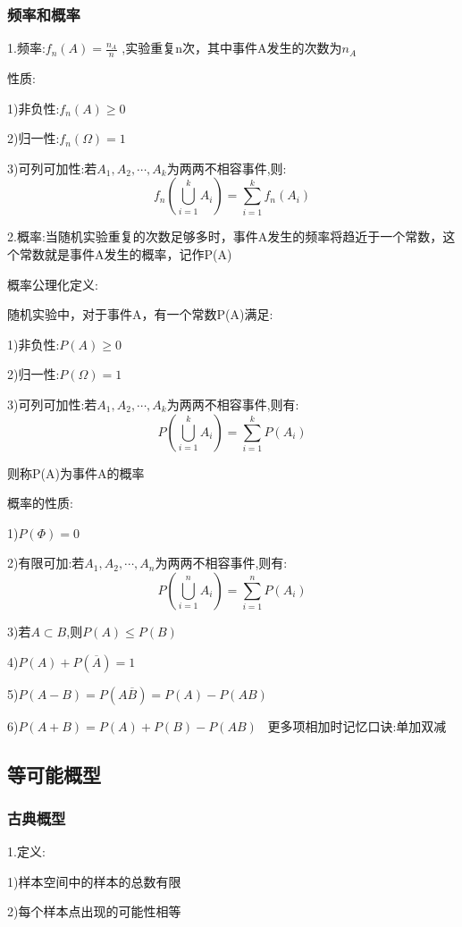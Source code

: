 \documentclass[11pt,twoside,a4paper]{ctexart}
\begin{document}
    \subsubsection{频率和概率}
    1.频率:$f_n(A) = \frac{n_A}{n}  $ ,实验重复n次，其中事件A发生的次数为$n_A $

    \quad 性质:
    \begin{minipage}[t]{0.9\linewidth}
        1)非负性:$f_n(A) \geq 0 $

        2)归一性:$f_n(\Omega) = 1 $

        3)可列可加性:若$A_1 , A_2 , \cdots , A_k $为两两不相容事件,则:\[f_n(\bigcup _{i=1}^k A_i) = \sum_{i=1}^k f_n(A_i)  \]
        
    \end{minipage}

    2.概率:当随机实验重复的次数足够多时，事件A发生的频率将趋近于一个常数，这个常数就是事件A发生的概率，记作P(A)

    概率公理化定义:
    \begin{minipage}[t]{0.9\linewidth}
        随机实验中，对于事件A，有一个常数P(A)满足:

        1)非负性:$P(A) \geq 0 $

        2)归一性:$P(\Omega) = 1 $

        3)可列可加性:若$A_1 , A_2 , \cdots , A_k $为两两不相容事件,则有:\[P(\bigcup _{i=1}^k A_i) = \sum_{i=1}^k P(A_i)  \]
    
    \end{minipage}
    则称P(A)为事件A的概率
    
    概率的性质:
    \begin{minipage}[t]{0.9\linewidth}
        1)$P(\varPhi ) = 0 $

        2)有限可加:若$A_1 , A_2 , \cdots , A_n $为两两不相容事件,则有:\[P(\bigcup _{i=1}^n A_i) = \sum_{i=1}^n P(A_i)  \]

        3)若$A\subset B $,则$P(A) \le P(B) $

        4)$P(A) + P(\overline{A}) = 1  $

        5)$P(A - B) = P(A\overline{B}) = P(A) - P(AB) $

        6)$P(A + B) = P(A) + P(B) - P(AB) $
        \ 更多项相加时记忆口诀:单加双减
    \end{minipage}
    \subsection{等可能概型}
    \subsubsection{古典概型}
    1.定义:
    \begin{minipage}[t]{0.9\linewidth}
        1)样本空间中的样本的总数有限

        2)每个样本点出现的可能性相等

    \end{minipage}
\end{document}
